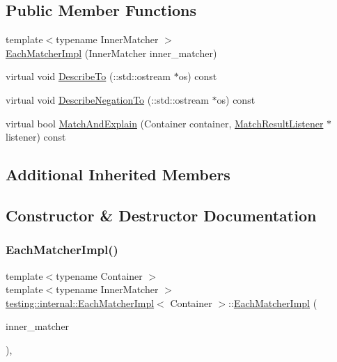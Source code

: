 \subsection*{Public Member Functions}
\begin{DoxyCompactItemize}
\item 
{\footnotesize template$<$typename Inner\+Matcher $>$ }\\\hyperlink{classtesting_1_1internal_1_1_each_matcher_impl_afe41214bf055abcdd60e475f207c7a0f}{Each\+Matcher\+Impl} (Inner\+Matcher inner\+\_\+matcher)
\item 
virtual void \hyperlink{classtesting_1_1internal_1_1_each_matcher_impl_a605e1c800c74701a773205ec050cd574}{Describe\+To} (\+::std\+::ostream $\ast$os) const
\item 
virtual void \hyperlink{classtesting_1_1internal_1_1_each_matcher_impl_a5be5bbd61f7a350fcbe30deea4c2a0c6}{Describe\+Negation\+To} (\+::std\+::ostream $\ast$os) const
\item 
virtual bool \hyperlink{classtesting_1_1internal_1_1_each_matcher_impl_a3b8ca89c85a96bbbcc74196ad29bf1ec}{Match\+And\+Explain} (Container container, \hyperlink{classtesting_1_1_match_result_listener}{Match\+Result\+Listener} $\ast$listener) const
\end{DoxyCompactItemize}
\subsection*{Additional Inherited Members}


\subsection{Constructor \& Destructor Documentation}
\mbox{\label{classtesting_1_1internal_1_1_each_matcher_impl_afe41214bf055abcdd60e475f207c7a0f}} 
\subsubsection{\texorpdfstring{Each\+Matcher\+Impl()}{EachMatcherImpl()}}
{\footnotesize\ttfamily template$<$typename Container $>$ \\
template$<$typename Inner\+Matcher $>$ \\
\hyperlink{classtesting_1_1internal_1_1_each_matcher_impl}{testing\+::internal\+::\+Each\+Matcher\+Impl}$<$ Container $>$\+::\hyperlink{classtesting_1_1internal_1_1_each_matcher_impl}{Each\+Matcher\+Impl} (\begin{DoxyParamCaption}\item[{Inner\+Matcher}]{inner\+\_\+matcher }\end{DoxyParamCaption})\hspace{0.3cm}{\ttfamily [inline]}, {\ttfamily [explicit]}}



